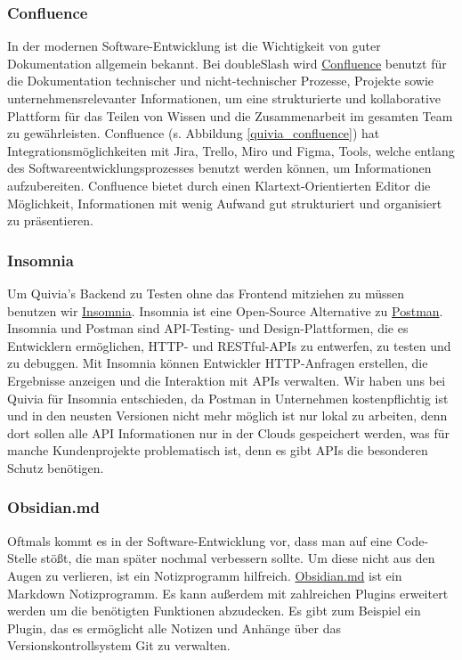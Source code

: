 \subsubsection{Confluence}
In der modernen Software-Entwicklung ist die Wichtigkeit von guter Dokumentation allgemein bekannt. Bei doubleSlash wird \href{https://www.atlassian.com/software/confluence}{Confluence}
benutzt für die Dokumentation technischer und nicht-technischer Prozesse, Projekte sowie unternehmensrelevanter Informationen, um eine strukturierte und
kollaborative Plattform für das Teilen von Wissen und die Zusammenarbeit im gesamten Team zu gewährleisten. Confluence (s. Abbildung \ref{quivia_confluence}) hat
Integrationsmöglichkeiten mit Jira, Trello, Miro und Figma, Tools, welche entlang des
Softwareentwicklungsprozesses benutzt werden können, um Informationen aufzubereiten. Confluence bietet durch einen Klartext-Orientierten Editor die Möglichkeit,
Informationen mit wenig Aufwand gut strukturiert und organisiert zu präsentieren.

\subsubsection{Insomnia}
Um Quivia's Backend zu Testen ohne das Frontend mitziehen zu müssen benutzen wir \href{https://insomnia.rest/}{Insomnia}. Insomnia ist eine
Open-Source Alternative zu \href{https://www.postman.com/}{Postman}. Insomnia und Postman sind API-Testing- und Design-Plattformen,
die es Entwicklern ermöglichen, HTTP- und RESTful-APIs zu entwerfen, zu testen und zu debuggen. Mit Insomnia können Entwickler
HTTP-Anfragen erstellen, die Ergebnisse anzeigen und die Interaktion mit APIs verwalten. Wir haben uns bei Quivia für Insomnia
entschieden, da Postman in Unternehmen kostenpflichtig ist und in den neusten Versionen nicht mehr möglich ist nur lokal zu arbeiten, denn
dort sollen alle API Informationen nur in der Clouds gespeichert werden, was für manche Kundenprojekte problematisch ist, denn es
gibt APIs die besonderen Schutz benötigen.

\subsubsection{Obsidian.md}
Oftmals kommt es in der Software-Entwicklung vor, dass man auf eine Code-Stelle stößt, die man später nochmal verbessern sollte. 
Um diese nicht aus den Augen zu verlieren, ist ein Notizprogramm hilfreich. \href{https://obsidian.md/}{Obsidian.md} ist ein Markdown Notizprogramm. 
Es kann außerdem mit zahlreichen Plugins erweitert werden um die benötigten Funktionen abzudecken. Es gibt zum Beispiel ein Plugin, 
das es ermöglicht alle Notizen und Anhänge über das Versionskontrollsystem Git zu verwalten.


